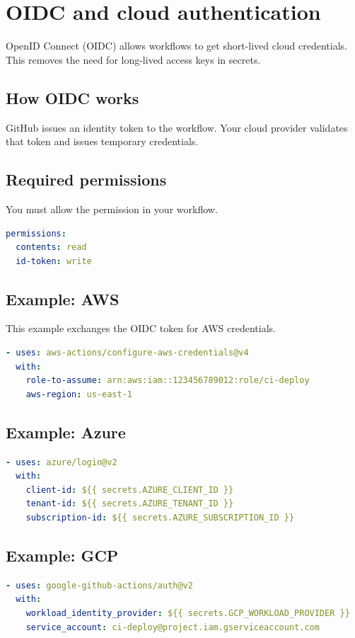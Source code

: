 \chapter{OIDC and cloud authentication}

OpenID Connect (OIDC) allows workflows to get short-lived cloud credentials.
This removes the need for long-lived access keys in secrets.

\section{How OIDC works}
GitHub issues an identity token to the workflow.
Your cloud provider validates that token and issues temporary credentials.

\section{Required permissions}
You must allow the  permission in your workflow.

\begin{lstlisting}[language=YAML]
permissions:
  contents: read
  id-token: write
\end{lstlisting}

\section{Example: AWS}
This example exchanges the OIDC token for AWS credentials.

\begin{lstlisting}[language=YAML]
- uses: aws-actions/configure-aws-credentials@v4
  with:
    role-to-assume: arn:aws:iam::123456789012:role/ci-deploy
    aws-region: us-east-1
\end{lstlisting}

\section{Example: Azure}
\begin{lstlisting}[language=YAML]
- uses: azure/login@v2
  with:
    client-id: ${{ secrets.AZURE_CLIENT_ID }}
    tenant-id: ${{ secrets.AZURE_TENANT_ID }}
    subscription-id: ${{ secrets.AZURE_SUBSCRIPTION_ID }}
\end{lstlisting}

\section{Example: GCP}
\begin{lstlisting}[language=YAML]
- uses: google-github-actions/auth@v2
  with:
    workload_identity_provider: ${{ secrets.GCP_WORKLOAD_PROVIDER }}
    service_account: ci-deploy@project.iam.gserviceaccount.com
\end{lstlisting}

